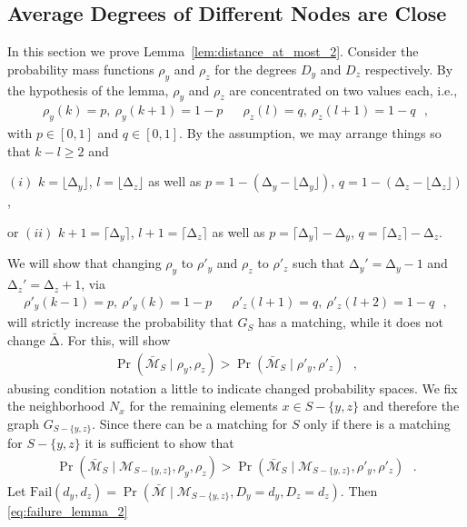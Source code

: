 \let\accentvec\vec \documentclass{llncs}
\newcommand{\degr}{\ensuremath{d}}
\newcommand{\randv}{\ensuremath{D}}
\newcommand{\pmf}{\ensuremath{{\rho}}}
\newcommand{\mean}{{\mathrm{\scriptstyle\Delta}}}
\newcommand{\Amean}{\bar{\mean}}
\newcommand{\floor}[1]{\ensuremath{\lfloor #1\rfloor}}
\newcommand{\ceil}[1]{\ensuremath{\lceil #1\rceil}}
\newcommand{\blank}{\text{ }}
\newcommand{\graph}{\ensuremath{G}}
\newcommand{\low}{\ensuremath{l}}
\newcommand{\high}{\ensuremath{k}}
\newcommand{\evNM}{\bar{\mathcal{M}}}
\newcommand{\evM}{{\mathcal{M}}}
\newcommand{\Fail}{\mathrm{Fail}}
\begin{document}
\subsection{Average Degrees of Different Nodes are Close}
\label{sec:lemma_distance_at_most_2}
In this section we prove Lemma~\ref{lem:distance_at_most_2}.
Consider the probability mass functions $\pmf_y$ and $\pmf_z$ for the degrees $\randv_y$ and $\randv_z$ respectively.
By the hypothesis of the lemma, $\pmf_y$ and $\pmf_z$ are concentrated on two values each, i.e.,
\begin{align*}
\pmf_y(\high)=p, \ \pmf_y(\high+1)=1-p & & \pmf_z(\low) =q, \ \pmf_z(\low+1) =1-q \blank,
\end{align*}
with $p\in[0,1]$ and $q\in[0,1]$. By the assumption, we may arrange things so that $\high-\low\geq 2$ and
\begin{compactitem}
\item[$(i)$] $\high  =\floor{\mean_y}$, $\low  =\floor{\mean_z}$ as well as $p=1-(\mean_y-\floor{\mean_y})$, $q=1-(\mean_z-\floor{\mean_z})$,
\item[or $(ii)$] $\high+1=\ceil{\mean_y}$,  $\low+1=\ceil{\mean_z}$ as well as $p=\ceil{\mean_y}-\mean_y$, $q=\ceil{\mean_z}-\mean_z$.
\end{compactitem}\smallskip
We will show that changing $\pmf_y$ to $\pmf'_y$
and $\pmf_z$ to $\pmf'_z$ such that $\mean_y'=\mean_y-1$ and $\mean_z'=\mean_z+1$, via
\begin{align*}
\pmf'_y(\high-1) =p, \ \pmf'_y(\high)=1-p && \pmf'_z(\low+1)=q, \ \pmf'_z(\low+2)=1-q \blank,
\end{align*}
will strictly increase the probability that $\graph_S$ has a matching, while it does not change $\Amean$. For this, will show
\begin{align*}
\Pr\left( \evNM_S \mid \pmf_y,\pmf_z \right) > \Pr\left( \evNM_S \mid \pmf'_y, \pmf'_z\right) \blank,
\end{align*}
abusing condition notation a little to indicate changed probability spaces.
We fix the neighborhood $N_x$ for the remaining elements $x \in S-\{y,z\}$ and therefore the graph $\graph_{S-\{y,z\}}$.
Since there can be a matching for $S$ only if there is a matching for $S-\{y,z\}$ it is sufficient to show that
\begin{align}
\label{eq:failure_lemma_2}
\Pr\left( \evNM_S \mid \evM_{S-\{y,z\}}, \pmf_y, \pmf_z \right) > \Pr\left( \evNM_S \mid \evM_{S-\{y,z\}}, \pmf'_y, \pmf'_z\right) \blank.
\end{align}
Let $\Fail(\degr_y,\degr_z)= \Pr\left( \evNM  \mid \evM_{S-\{y,z\}} , \randv_y=\degr_y, \randv_z=\degr_z \right)$. Then \eqref{eq:failure_lemma_2}
\end{document}
